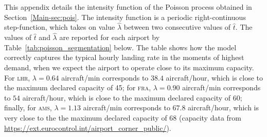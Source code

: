 \documentclass[]{elsarticle}
\newcommand{\airp}[1]{\textcolor{#1}{\textsc{#1}}}
\begin{document}
  This appendix details the intensity function of the Poisson process obtained in Section~\ref{Main-sec:pois}.
  The intensity function is a periodic right-continuous step-function, which takes on value \(\hat{\lambda}\) between two consecutive values of \(\hat{t}\).
  The values of \(\hat{t}\) and \(\hat{\lambda}\) are reported for each airport by Table~\ref{tab:poisson_segmentation} below.
  The table shows how the model correctly captures the typical hourly landing rate in the moments of highest demand, when we expect the airport to operate close to its maximum capacity. For \airp{lhr}, \(\lambda = 0.64\) aircraft/min corresponds to \(38.4\) aircraft/hour, which is close to the maximum declared capacity of 45; for \airp{fra}, \(\lambda = 0.90\) aircraft/min corresponds to \(54\) aircraft/hour, which is close to the maximum declared capacity of 60; finally, for \airp{ams}, \(\lambda = 1.13\) aircraft/min corresponds to \(67.8\) aircraft/hour, which is very close to the the maximum declared capacity of 68 (capacity data from \url{https://ext.eurocontrol.int/airport_corner_public/}).
\end{document}
